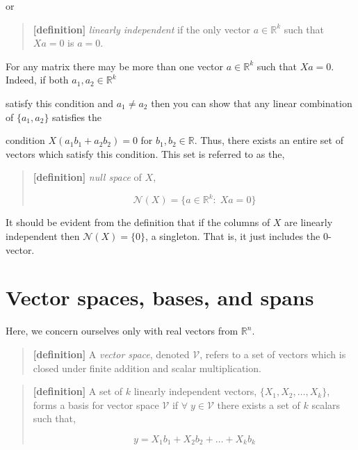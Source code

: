 \documentclass[
  letterpaper,
  DIV=11,
  numbers=noendperiod]{scrreprt}
\begin{document}
or

\begin{quote}
\textbf{{[}definition{]}} \emph{linearly independent} if the only vector
\(a\in\mathbb{R}^k\) such that \(Xa=0\) is \(a=0\).
\end{quote}

For any matrix there may be more than one vector \(a\in\mathbb{R}^{k}\)
such that \(Xa=0\). Indeed, if both \(a_{1},a_{2}\in\mathbb{R}^{k}\)

satisfy this condition and \(a_{1}\neq a_{2}\) then you can show that
any linear combination of \(\{a_{1},a_{2}\}\) satisfies the

condition \(X(a_{1}b_{1}+a_{2}b_{2})=0\) for
\(b_{1},b_{2}\in\mathbb{R}\). Thus, there exists an entire set of
vectors which satisfy this condition. This set is referred to as the,

\begin{quote}
\textbf{{[}definition{]}} \emph{null space} of \(X\),

\[
\mathcal{N}(X) = \{a\in\mathbb{R}^k:\;Xa=0\}
\]
\end{quote}

It should be evident from the definition that if the columns of \(X\)
are linearly independent then \(\mathcal{N}(X)=\{0\}\), a singleton.
That is, it just includes the 0-vector.

\hypertarget{vector-spaces-bases-and-spans}{%
\section{Vector spaces, bases, and
spans}\label{vector-spaces-bases-and-spans}}

Here, we concern ourselves only with real vectors from \(\mathbb{R}^n\).

\begin{quote}
\textbf{{[}definition{]}} A \emph{vector space}, denoted
\(\mathcal{V}\), refers to a set of vectors which is closed under finite
addition and scalar multiplication.
\end{quote}

\begin{quote}
\textbf{{[}definition{]}} A set of \(k\) linearly independent vectors,
\(\{X_1,X_2,\dots,X_k\}\), forms a basis for vector space
\(\mathcal{V}\) if \(\forall\;y\in\mathcal{V}\) there exists a set of
\(k\) scalars such that,

\[
y=X_1b_1+X_2b_2+\ldots+X_kb_k
\]
\end{quote}
\end{document}
